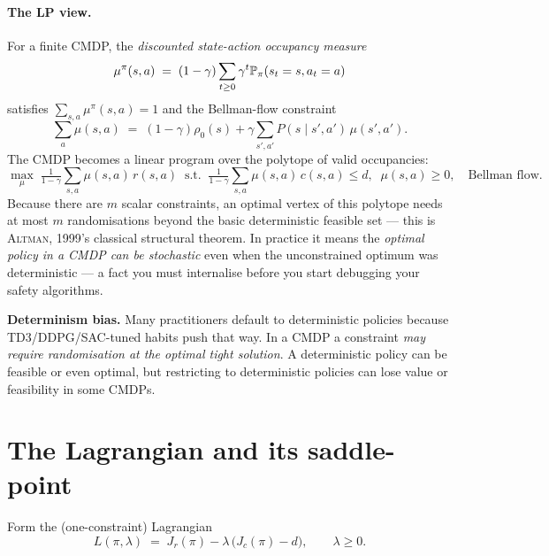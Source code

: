 \documentclass[11pt,oneside]{scrbook}
\begin{document}
\paragraph{The LP view.}
For a finite CMDP, the \emph{discounted state-action occupancy measure}
\[
  \mu^\pi(s,a) \;=\; (1-\gamma) \sum_{t \geq 0} \gamma^t \mathbb{P}_\pi(s_t = s, a_t = a)
\]
satisfies $\sum_{s,a} \mu^\pi(s,a) = 1$ and the Bellman-flow constraint
\[
  \sum_a \mu(s,a) \;=\; (1-\gamma)\rho_0(s) + \gamma \sum_{s',a'} P(s\mid s',a')\, \mu(s',a').
\]
The CMDP becomes a linear program over the polytope of valid occupancies:
\[
  \max_\mu\; \tfrac{1}{1-\gamma}\!\sum_{s,a} \mu(s,a)\, r(s,a)
  \;\;\text{s.t.}\;\; \tfrac{1}{1-\gamma}\!\sum_{s,a} \mu(s,a)\, c(s,a) \leq d,
  \;\; \mu(s,a)\geq 0,\quad \text{Bellman flow}.
\]
Because there are $m$ scalar constraints, an optimal vertex of this polytope
needs at most $m$ randomisations beyond the basic deterministic feasible set
--- this is \textsc{Altman, 1999}'s classical structural theorem. In practice
it means the \emph{optimal policy in a CMDP can be stochastic} even when the
unconstrained optimum was deterministic --- a fact you must internalise before
you start debugging your safety algorithms.

\begin{pitfall}
\textbf{Determinism bias.} Many practitioners default to deterministic policies
because TD3/DDPG/SAC-tuned habits push that way. In a CMDP a constraint
\emph{may require randomisation at the optimal tight solution}.
A deterministic policy can be feasible or even optimal, but restricting
to deterministic policies can lose value or feasibility in some CMDPs.
\end{pitfall}

\section{The Lagrangian and its saddle-point}

Form the (one-constraint) Lagrangian
\begin{equation}\label{eq:lagrangian}
   L(\pi, \lambda) \;=\; J_r(\pi) - \lambda\, \bigl( J_c(\pi) - d \bigr), \qquad \lambda \geq 0.
\end{equation}
\end{document}
